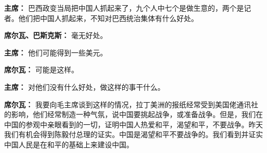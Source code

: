 \begin{duihua}
\item[\textbf{主席：}] 巴西政变当局把中国人抓起来了，九个人中七个是做生意的，两个是记者。他们把中国人抓起来，不知对巴西统治集体有什么好处。

\item[\textbf{席尔瓦、巴斯克斯：}] 毫无好处。

\item[\textbf{主席：}] 他们可能得到一些美元。

\item[\textbf{席尔瓦：}] 可能是这样。

\item[\textbf{主席：}] 对他们没有什么好处，做这样的事干什么。

\item[\textbf{席尔瓦：}] 我要向毛主席谈到这样的情况，拉丁美洲的报纸经常受到美国佬通讯社的影响，他们经常制造一种气氛，说中国要挑起战争，或准备战争。但是，我们在中国的参观中亲眼看到的一切，证明中国人热爱和平，渴望和平，不要战争。昨天我们有机会得到陈毅付总理的证实。中国是渴望和平不要战争的。我们看到并证实中国人民是在和平的基础上来建设中国。


\end{duihua}
